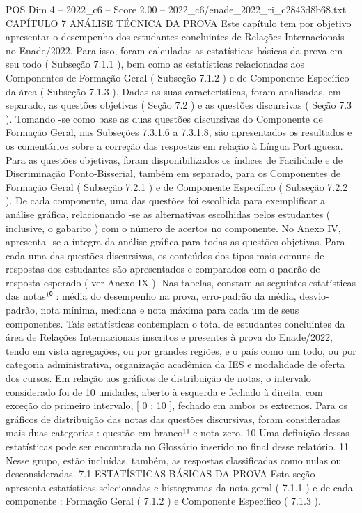 \begin{textsample}{POS Dim 4 – 2022\_c6 – Score 2.00 – 2022\_c6/enade\_2022\_ri\_c2843d8b68.txt}  \label{ex:f4_pos_090}
CAPÍTULO 7 ANÁLISE TÉCNICA DA PROVA Este capítulo tem por objetivo apresentar o desempenho dos estudantes concluintes de Relações Internacionais no Enade/2022.
Para isso, foram calculadas as estatísticas básicas da prova em seu todo ( Subseção 7.1.1 ), bem como as estatísticas relacionadas aos Componentes de Formação Geral ( Subseção 7.1.2 ) e de Componente Específico da área ( Subseção 7.1.3 ).
Dadas as suas características, foram analisadas, em separado, as questões objetivas ( Seção 7.2 ) e as questões discursivas ( Seção 7.3 ).
Tomando -se como base as duas questões discursivas do Componente de Formação Geral, nas Subseções 7.3.1.6 a 7.3.1.8, são apresentados os resultados e os comentários sobre a correção das respostas em relação à Língua Portuguesa.
Para as questões objetivas, foram disponibilizados os índices de Facilidade e de Discriminação Ponto-Bisserial, também em separado, para os Componentes de Formação Geral ( Subseção 7.2.1 ) e de Componente Específico ( Subseção 7.2.2 ).
De cada componente, uma das questões foi escolhida para exemplificar a análise gráfica, relacionando -se as alternativas escolhidas pelos estudantes ( inclusive, o gabarito ) com o número de acertos no componente.
No Anexo IV, apresenta -se a íntegra da análise gráfica para todas as questões objetivas.
Para cada uma das questões discursivas, os conteúdos dos tipos mais comuns de respostas dos estudantes são apresentados e comparados com o padrão de resposta esperado ( ver Anexo IX ).
Nas tabelas, constam as seguintes estatísticas das notas¹⁰ : média do desempenho na prova, erro-padrão da média, desvio-padrão, nota mínima, mediana e nota máxima para cada um de seus componentes.
Tais estatísticas contemplam o total de estudantes concluintes da área de Relações Internacionais inscritos e presentes à prova do Enade/2022, tendo em vista agregações, ou por grandes regiões, e o país como um todo, ou por categoria administrativa, organização acadêmica da IES e modalidade de oferta dos cursos.
Em relação aos gráficos de distribuição de notas, o intervalo considerado foi de 10 unidades, aberto à esquerda e fechado à direita, com exceção do primeiro intervalo, [ 0 ; 10 ], fechado em ambos os extremos.
Para os gráficos de distribuição das notas das questões discursivas, foram consideradas mais duas categorias : questão em branco¹¹ e nota zero. 10 Uma definição dessas estatísticas pode ser encontrada no Glossário inserido no final desse relatório. 11 Nesse grupo, estão incluídas, também, as respostas classificadas como nulas ou desconsideradas. 7.1 ESTATÍSTICAS BÁSICAS DA PROVA Esta seção apresenta estatísticas selecionadas e histogramas da nota geral ( 7.1.1 ) e de cada componente : Formação Geral ( 7.1.2 ) e Componente Específico ( 7.1.3 ).

\end{textsample}

